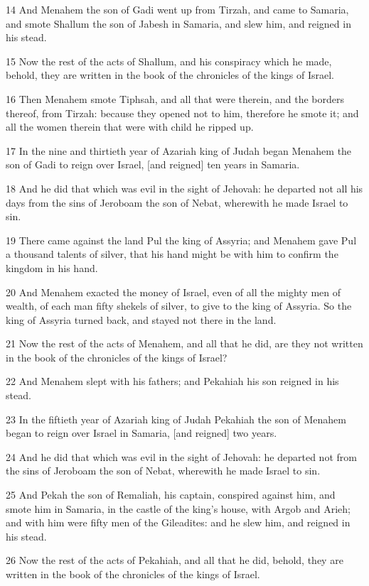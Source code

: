 \par 14 And Menahem the son of Gadi went up from Tirzah, and came to Samaria, and smote Shallum the son of Jabesh in Samaria, and slew him, and reigned in his stead.
\par 15 Now the rest of the acts of Shallum, and his conspiracy which he made, behold, they are written in the book of the chronicles of the kings of Israel.
\par 16 Then Menahem smote Tiphsah, and all that were therein, and the borders thereof, from Tirzah: because they opened not to him, therefore he smote it; and all the women therein that were with child he ripped up.
\par 17 In the nine and thirtieth year of Azariah king of Judah began Menahem the son of Gadi to reign over Israel, [and reigned] ten years in Samaria.
\par 18 And he did that which was evil in the sight of Jehovah: he departed not all his days from the sins of Jeroboam the son of Nebat, wherewith he made Israel to sin.
\par 19 There came against the land Pul the king of Assyria; and Menahem gave Pul a thousand talents of silver, that his hand might be with him to confirm the kingdom in his hand.
\par 20 And Menahem exacted the money of Israel, even of all the mighty men of wealth, of each man fifty shekels of silver, to give to the king of Assyria. So the king of Assyria turned back, and stayed not there in the land.
\par 21 Now the rest of the acts of Menahem, and all that he did, are they not written in the book of the chronicles of the kings of Israel?
\par 22 And Menahem slept with his fathers; and Pekahiah his son reigned in his stead.
\par 23 In the fiftieth year of Azariah king of Judah Pekahiah the son of Menahem began to reign over Israel in Samaria, [and reigned] two years.
\par 24 And he did that which was evil in the sight of Jehovah: he departed not from the sins of Jeroboam the son of Nebat, wherewith he made Israel to sin.
\par 25 And Pekah the son of Remaliah, his captain, conspired against him, and smote him in Samaria, in the castle of the king's house, with Argob and Arieh; and with him were fifty men of the Gileadites: and he slew him, and reigned in his stead.
\par 26 Now the rest of the acts of Pekahiah, and all that he did, behold, they are written in the book of the chronicles of the kings of Israel.
